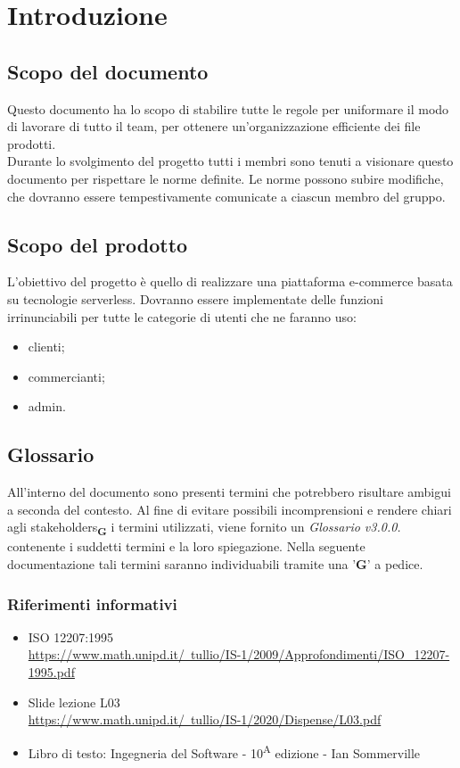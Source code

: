 \section{Introduzione}
\subsection{Scopo del documento}
Questo documento ha lo scopo di stabilire tutte le regole per uniformare il modo di lavorare di tutto il team, per ottenere un'organizzazione efficiente dei file prodotti.\\Durante lo svolgimento del progetto tutti i membri sono tenuti a visionare questo documento per rispettare le norme definite.
Le norme possono subire modifiche, che dovranno essere tempestivamente comunicate a ciascun membro del gruppo.

\subsection{Scopo del prodotto}
L'obiettivo del progetto è quello di realizzare una piattaforma e-commerce basata su tecnologie serverless. Dovranno essere implementate delle funzioni irrinunciabili per tutte le categorie di utenti che ne faranno uso:
\begin{itemize}
    \item clienti;
    \item commercianti;
    \item admin.
\end{itemize}
\subsection{Glossario}
All'interno del documento sono presenti termini che potrebbero risultare ambigui a seconda del contesto. Al fine di evitare possibili incomprensioni
e rendere chiari agli stakeholders\textsubscript{\textbf{G}} i termini utilizzati, viene fornito un \textit{Glossario v3.0.0.} contenente i suddetti termini
e la loro spiegazione. Nella seguente documentazione tali termini saranno individuabili tramite una '\textbf{G}' a pedice.


\subsubsection{Riferimenti informativi}
\begin{itemize}
    \item ISO 12207:1995\\
          \href{https://www.math.unipd.it/~tullio/IS-1/2009/Approfondimenti/ISO\_12207-1995.pdf}{https://www.math.unipd.it/~tullio/IS-1/2009/Approfondimenti/ISO\_12207-1995.pdf}
    \item Slide lezione L03\\ \href{https://www.math.unipd.it/~tullio/IS-1/2020/Dispense/L03.pdf}{https://www.math.unipd.it/~tullio/IS-1/2020/Dispense/L03.pdf}
    \item Libro di testo: Ingegneria del Software - 10\textsuperscript{A} edizione - Ian Sommerville
\end{itemize}